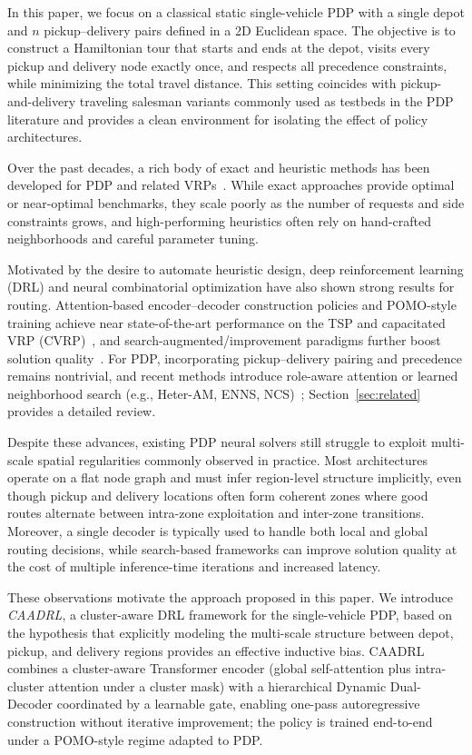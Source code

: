 \documentclass[pdflatex,sn-basic,Numbered]{sn-jnl}
\begin{document}
In this paper, we focus on a classical static single-vehicle PDP with a single depot and $n$ pickup--delivery pairs defined in a 2D Euclidean space. The objective is to construct a Hamiltonian tour that starts and ends at the depot, visits every pickup and delivery node exactly once, and respects all precedence constraints, while minimizing the total travel distance. This setting coincides with pickup-and-delivery traveling salesman variants commonly used as testbeds in the PDP literature and provides a clean environment for isolating the effect of policy architectures.

Over the past decades, a rich body of exact and heuristic methods has been developed for PDP and related VRPs~\cite{Parragh2008,ghilas2016alns}. While exact approaches provide optimal or near-optimal benchmarks, they scale poorly as the number of requests and side constraints grows, and high-performing heuristics often rely on hand-crafted neighborhoods and careful parameter tuning.

Motivated by the desire to automate heuristic design, deep reinforcement learning (DRL) and neural combinatorial optimization have also shown strong results for routing. Attention-based encoder--decoder construction policies and POMO-style training achieve near state-of-the-art performance on the TSP and capacitated VRP (CVRP)~\cite{vinyals2015pointer,bello2016nco,kool2019attention,nazari2018rl4vrp,kwon2020pomo}, and search-augmented/improvement paradigms further boost solution quality~\cite{chen2019neurewriter,wu2022improvement,sun2024difusco}. For PDP, incorporating pickup--delivery pairing and precedence remains nontrivial, and recent methods introduce role-aware attention or learned neighborhood search (e.g., Heter-AM, ENNS, NCS)~\cite{li2022heter,ma2021enns,kong2024ncs}; Section~\ref{sec:related} provides a detailed review.

Despite these advances, existing PDP neural solvers still struggle to exploit multi-scale spatial regularities commonly observed in practice. Most architectures operate on a flat node graph and must infer region-level structure implicitly, even though pickup and delivery locations often form coherent zones where good routes alternate between intra-zone exploitation and inter-zone transitions. Moreover, a single decoder is typically used to handle both local and global routing decisions, while search-based frameworks can improve solution quality at the cost of multiple inference-time iterations and increased latency.

These observations motivate the approach proposed in this paper. We introduce \emph{CAADRL}, a cluster-aware DRL framework for the single-vehicle PDP, based on the hypothesis that explicitly modeling the multi-scale structure between depot, pickup, and delivery regions provides an effective inductive bias. CAADRL combines a cluster-aware Transformer encoder (global self-attention plus intra-cluster attention under a cluster mask) with a hierarchical Dynamic Dual-Decoder coordinated by a learnable gate, enabling one-pass autoregressive construction without iterative improvement; the policy is trained end-to-end under a POMO-style regime adapted to PDP.
\end{document}

